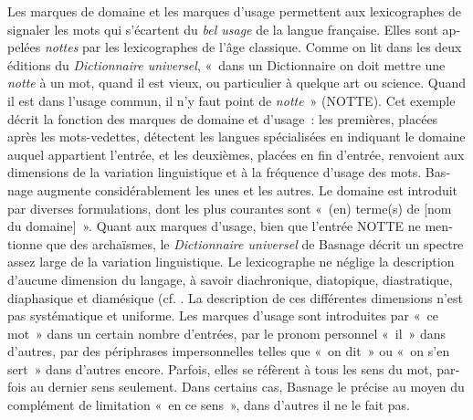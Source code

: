 \documentclass[output=paper,colorlinks,citecolor=brown,arabicfont,chinesefont,booklanguage=french]{langscibook}
\begin{document}
\begin{otherlanguage}{french}
Les marques de domaine et les marques d'usage permettent aux lexicographes de signaler les mots qui s’écartent du \emph{bel usage} de la langue française. Elles sont appelées \emph{nottes} par les lexicographes de l'âge classique. Comme on lit dans les deux éditions du \emph{Dictionnaire universel}, «~dans un Dictionnaire on doit mettre une \emph{notte} à un mot, quand il est vieux, ou particulier à quelque art ou science. Quand il est dans l'usage commun, il n'y faut point de \emph{notte}~» (NOTTE). Cet exemple décrit la fonction des marques de domaine et d’usage~: les premières, placées après les mots-vedettes, détectent les langues spécialisées en indiquant le domaine auquel appartient l'entrée, et les deuxièmes, placées en fin d'entrée, renvoient aux dimensions de la variation linguistique et à la fréquence d’usage des mots. Basnage augmente considérablement les unes et les autres. Le domaine est introduit par diverses formulations, dont les plus courantes sont «~(en) terme(s) de [nom du domaine]~». Quant aux marques d’usage, bien que l'entrée NOTTE ne mentionne que des archaïsmes, le \emph{Dictionnaire universel} de Basnage décrit un spectre assez large de la variation linguistique. Le lexicographe ne néglige la description d'aucune dimension du langage, à savoir diachronique, diatopique, diastratique, diaphasique et diamésique (cf. \citet{Coseriu1977}. La description de ces différentes dimensions n'est pas systématique et uniforme. Les marques d'usage sont introduites par «~ce mot~» dans un certain nombre d'entrées, par le pronom personnel «~il~» dans d'autres, par des périphrases impersonnelles telles que «~on dit~» ou «~on s'en sert~» dans d'autres encore. Parfois, elles se réfèrent à tous les sens du mot, parfois au dernier sens seulement. Dans certains cas, Basnage le précise au moyen du complément de limitation «~en ce sens~», dans d'autres il ne le fait pas.


\end{otherlanguage}
\end{document}
